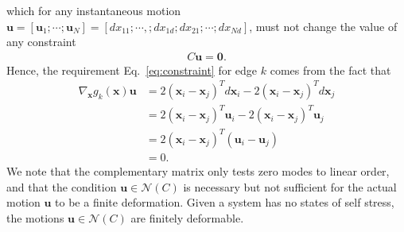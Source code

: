 \documentclass[%
preprint,
 amsmath,amssymb,
 aps,
]{revtex4-1}
\newcommand{\mc}{\mathcal}
\begin{document}
which for any instantaneous motion $\bm{u} = [\bm{u}_1; \dotsm; \bm{u}_N] = [dx_{11}; \dotsm,; dx_{1d}; dx_{21}; \dotsm; dx_{Nd}]$, must not change the value of any constraint
\begin{align*}
C\bm{u} = \bm{0}.
\end{align*}
Hence, the requirement Eq.~\ref{eq:constraint} for edge $k$ comes from the fact that 
\begin{align*}
\nabla_{\bm{x}} g_k(\bm{x}) \bm{u}
&= 2(\bm{x}_i - \bm{x}_j)^T d\bm{x}_i - 2(\bm{x}_i - \bm{x}_j)^T d\bm{x}_j\\
&= 2(\bm{x}_i - \bm{x}_j)^T \bm{u}_i - 2(\bm{x}_i - \bm{x}_j)^T \bm{u}_j\\
&= 2(\bm{x}_i - \bm{x}_j)^T(\bm{u}_i - \bm{u}_j)\\
&= 0.
\end{align*}
We note that the complementary matrix only tests zero modes to linear order, and that the condition $\bm{u} \in \mc N(C)$ is necessary but not sufficient for the actual motion $\bm{u}$ to be a finite deformation. Given a system has no states of self stress, the motions $\bm{u} \in \mc N(C)$ are finitely deformable. 
\end{document}
